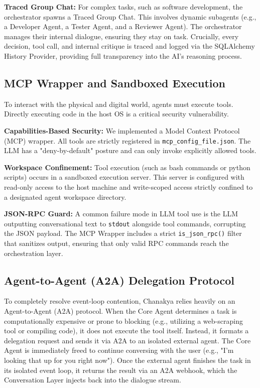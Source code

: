 \documentclass[conference]{IEEEtran}
\begin{document}
\textbf{Traced Group Chat:} For complex tasks, such as software development, the orchestrator spawns a Traced Group Chat. This involves dynamic subagents (e.g., a Developer Agent, a Tester Agent, and a Reviewer Agent). The orchestrator manages their internal dialogue, ensuring they stay on task. Crucially, every decision, tool call, and internal critique is traced and logged via the SQLAlchemy History Provider, providing full transparency into the AI's reasoning process.

\subsection{MCP Wrapper and Sandboxed Execution}
To interact with the physical and digital world, agents must execute tools. Directly executing code in the host OS is a critical security vulnerability.

\textbf{Capabilities-Based Security:} We implemented a Model Context Protocol (MCP) wrapper. All tools are strictly registered in \texttt{mcp\_config\_file.json}. The LLM has a "deny-by-default" posture and can only invoke explicitly allowed tools.

\textbf{Workspace Confinement:} Tool execution (such as bash commands or python scripts) occurs in a sandboxed execution server. This server is configured with read-only access to the host machine and write-scoped access strictly confined to a designated agent workspace directory.

\textbf{JSON-RPC Guard:} A common failure mode in LLM tool use is the LLM outputting conversational text to \texttt{stdout} alongside tool commands, corrupting the JSON payload. The MCP Wrapper includes a strict \texttt{is\_json\_rpc()} filter that sanitizes output, ensuring that only valid RPC commands reach the orchestration layer.

\subsection{Agent-to-Agent (A2A) Delegation Protocol}
To completely resolve event-loop contention, Chanakya relies heavily on an Agent-to-Agent (A2A) protocol. When the Core Agent determines a task is computationally expensive or prone to blocking (e.g., utilizing a web-scraping tool or compiling code), it does not execute the tool itself. Instead, it formats a delegation request and sends it via A2A to an isolated external agent. The Core Agent is immediately freed to continue conversing with the user (e.g., "I'm looking that up for you right now"). Once the external agent finishes the task in its isolated event loop, it returns the result via an A2A webhook, which the Conversation Layer injects back into the dialogue stream.
\end{document}
